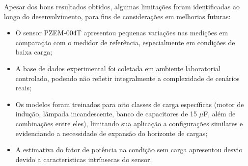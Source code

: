 \clearpage
Apesar dos bons resultados obtidos, algumas limitações foram identificadas ao longo do desenvolvimento, para fins de considerações em melhorias futuras:
\begin{itemize}
    \item O sensor PZEM-004T apresentou pequenas variações nas medições em comparação com o medidor de referência, especialmente em condições de baixa carga;
    \item A base de dados experimental foi coletada em ambiente laboratorial controlado, podendo não refletir integralmente a complexidade de cenários reais;
    \item Os modelos foram treinados para oito classes de carga específicas (motor de indução, lâmpada incandescente, banco de capacitores de 15 $\mu$F, além de combinações entre eles), limitando sua aplicação a configurações similares e evidenciando a necessidade de expansão do horizonte de cargas;
    \item A estimativa do fator de potência na condição sem carga apresentou desvio devido a características intrínsecas do sensor.
\end{itemize}

    
    
    
    
    
    
